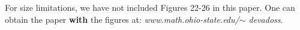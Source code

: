 \documentclass[10pt]{amsart}
\begin{document}
            
            \begin{rem}
            For size limitations, we have not included Figures 22-26 in this paper.  One can obtain the paper {\bf with} the figures at:  {\em www.math.ohio-state.edu/$\sim$ devadoss}.
            \end{rem}
            
            \clearpage
            
            
\end{document}
